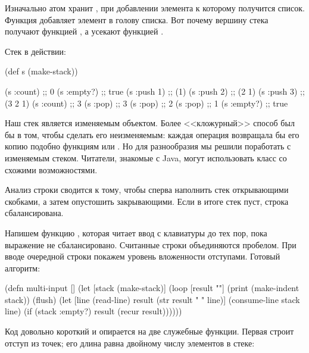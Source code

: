 
Изначально атом хранит , при добавлении элемента к которому получится список. Функция  добавляет элемент в голову списка. Вот почему вершину стека получают функцией , а усекают функцией  .

\pagebreaklarge

Стек в действии:

\begin{english}
  \begin{clojure}
(def s (make-stack))

(s :count)  ;; 0
(s :empty?) ;; true
(s :push 1) ;; (1)
(s :push 2) ;; (2 1)
(s :push 3) ;; (3 2 1)
(s :count)  ;; 3
(s :pop)    ;; 3
(s :pop)    ;; 2
(s :pop)    ;; 1
(s :empty?) ;; true
  \end{clojure}
\end{english}

Наш стек является изменяемым объектом. Более <<кложурный>> способ был бы в том, чтобы сделать его неизменяемым: каждая операция возвращала бы его копию подобно функциям  или . Но для разнообразия мы решили поработать с изменяемым стеком. Читатели, знакомые с Java, могут использовать класс  со схожими возможностями.


Анализ строки сводится к тому, чтобы сперва наполнить стек открывающими скобками, а затем опустошить закрывающими. Если в итоге стек пуст, строка сбалансирована.

Напишем функцию , которая читает ввод с клавиатуры до тех пор, пока выражение не сбалансировано. Считанные строки объединяются пробелом. При вводе очередной строки покажем уровень вложенности отступами. Готовый алгоритм:

\begin{english}
  \begin{clojure}
(defn multi-input []
  (let [stack (make-stack)]
    (loop [result ""]
      (print (make-indent stack))
      (flush)
      (let [line (read-line)
            result (str result " " line)]
        (consume-line stack line)
        (if (stack :empty?)
          result
          (recur result))))))
  \end{clojure}
\end{english}

Код довольно короткий и опирается на две служебные функции. Первая  строит отступ из точек; его длина равна двойному числу элементов в стеке:

